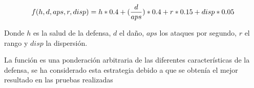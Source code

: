 
$$f(h, d, aps, r, disp) = h * 0.4  + (\frac{d}{aps}) * 0.4 + r * 0.15 \\ 
+ disp * 0.05$$

Donde $h$ es la salud de la defensa, $d$ el daño, $aps$ los ataques por segundo, $r$ el rango y $disp$ la dispersión.

La función es una ponderación arbitraria de las diferentes características de la defensa, se ha considerado esta estrategia debido a 
que se obtenía el mejor resultado en las pruebas realizadas
